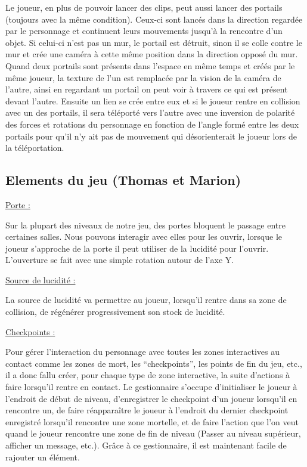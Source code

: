 \documentclass[a4paper , 12pt]{article}
\begin{document}
Le joueur, en plus de pouvoir lancer des clips, peut aussi lancer des portails (toujours avec la même condition). Ceux-ci sont lancés dans la direction regardée par le personnage et continuent leurs mouvements jusqu’à la rencontre d’un objet. Si celui-ci n’est pas un mur, le portail est détruit, sinon il se colle contre le mur et crée une caméra à cette même position dans la direction opposé du mur. Quand deux portails sont présents dans l’espace en même temps et créés par le même joueur, la texture de l’un est remplacée par la vision de la caméra de l’autre, ainsi en regardant un portail on peut voir à travers ce qui est présent devant l’autre. Ensuite un lien se crée entre eux et si le joueur rentre en collision avec un des portails, il sera téléporté vers l’autre avec une inversion de polarité des forces et rotations du personnage en fonction de l’angle formé entre les deux portails pour qu’il n’y ait pas de mouvement qui désorienterait le joueur lors de la téléportation.

\quad

\newpage

	\subsection{Elements du jeu (Thomas et Marion)}
	
	\underline{Porte : }

	\quad

Sur la plupart des niveaux de notre jeu, des portes bloquent le passage entre certaines salles. Nous  pouvons interagir avec elles pour les ouvrir, lorsque le joueur s’approche de la porte il peut utiliser de la lucidité pour l’ouvrir. L’ouverture se fait avec une simple rotation autour de l’axe Y.

\quad

	\underline{Source de lucidité : }

	\quad

La source de lucidité va permettre au joueur, lorsqu’il rentre dans sa zone de collision, de régénérer progressivement son stock de lucidité.


\quad

	\underline{Checkpoints : }

	\quad

Pour gérer l’interaction du personnage avec toutes les zones interactives au contact comme les zones de mort, les “checkpoints”, les points de fin du jeu, etc., il a donc fallu créer, pour chaque type de zone interactive, la suite d’actions à faire lorsqu’il rentre en contact. Le gestionnaire s’occupe d’initialiser le joueur à l’endroit de début de niveau, d’enregistrer le checkpoint d’un joueur lorsqu’il en rencontre un, de faire réapparaître le joueur à l’endroit du dernier checkpoint enregistré lorsqu’il rencontre une zone mortelle, et de faire l’action que l’on veut quand le joueur rencontre une zone de fin de niveau (Passer au niveau supérieur, afficher un message, etc.). Grâce à ce gestionnaire, il est maintenant facile de rajouter un élément.
\end{document}
